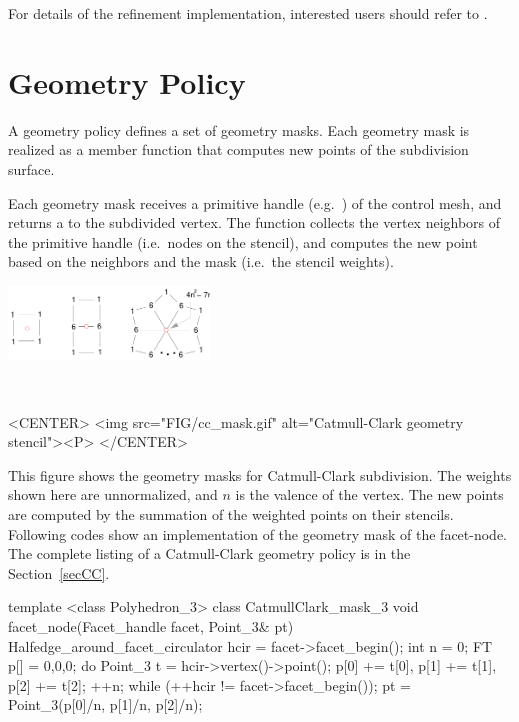 For details of the refinement implementation, 
interested users should refer to \cite{cgal:sp-mrbee-05}.

\section{Geometry Policy}
A geometry policy defines a set of geometry masks. 
Each geometry mask is realized as a member function
that computes new points of the subdivision surface. 

Each geometry mask receives a primitive handle 
(e.g.~) of the control mesh, 
and returns a  to the subdivided vertex. 
The function collects the vertex neighbors of the primitive handle 
(i.e.~nodes on the stencil), and computes the new point 
based on the neighbors and the mask (i.e.~the stencil weights).

\begin{ccTexOnly}
  \begin{center}
    \parbox{0.4\textwidth}{%
      \includegraphics[width=0.4\textwidth]{Subdivision_method_3/FIG/cc_mask}%
    } \\ \vspace{0.5cm}
  \end{center}
\end{ccTexOnly}
\begin{ccHtmlOnly}
  <CENTER>
     <img src="FIG/cc_mask.gif" alt="Catmull-Clark geometry stencil"><P>
  </CENTER>
\end{ccHtmlOnly}

This figure shows the geometry masks for
Catmull-Clark subdivision. The weights shown here are unnormalized, 
and $n$ is the valence of the vertex. The new points are 
computed by the summation of the weighted points on their stencils.
Following codes show an implementation of the geometry mask of 
the facet-node. The complete listing
of a Catmull-Clark geometry policy is in the Section~\ref{secCC}.

\begin{ccExampleCode}
template <class Polyhedron_3>
class CatmullClark_mask_3 {
  void facet_node(Facet_handle facet, Point_3& pt) {
    Halfedge_around_facet_circulator hcir = facet->facet_begin();
    int n = 0;
    FT p[] = {0,0,0};
    do {
      Point_3 t = hcir->vertex()->point();
      p[0] += t[0], p[1] += t[1], p[2] += t[2]; 
      ++n;
    } while (++hcir != facet->facet_begin());
    pt = Point_3(p[0]/n, p[1]/n, p[2]/n);
  }
}
\end{ccExampleCode}

